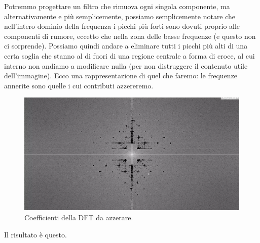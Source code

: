 \documentclass[a4paper,11pt]{article}
\begin{document}
Potremmo progettare un filtro che rimuova ogni singola
componente, ma alternativamente e più semplicemente, possiamo semplicemente notare che nell'intero dominio della frequenza i picchi più forti
sono dovuti proprio alle componenti di rumore, eccetto che nella zona delle basse frequenze (e questo non ci sorprende).
Possiamo quindi andare a eliminare tutti i picchi più alti di una certa soglia che stanno al di fuori di una regione centrale a forma di croce,
al cui interno non andiamo a modificare nulla (per non distruggere il contenuto utile dell'immagine).
Ecco una rappresentazione di quel che faremo: le frequenze annerite sono quelle i cui contributi azzereremo.

\renewcommand{\thefigure}{8.9}
\begin{figure}[!h]
  \centering
    \includegraphics[scale=0.4]{images/8/photoprint_dft_with_coeffs_to_be_deleted.png}
    \caption{Coefficienti della DFT da azzerare.}
\end{figure}

\newpage
Il risultato è questo.
\end{document}
